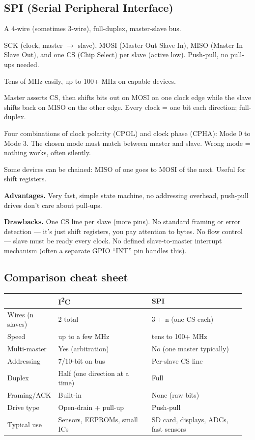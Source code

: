 \documentclass[11pt,a4paper]{article}
\begin{document}
\subsection{SPI (Serial Peripheral Interface)}

A 4-wire (sometimes 3-wire), full-duplex, master-slave bus.

\begin{description}[leftmargin=*, style=nextline]
    \item[Wires] SCK (clock, master $\rightarrow$ slave), MOSI (Master Out
    Slave In), MISO (Master In Slave Out), and one CS (Chip Select) per
    slave (active low). Push-pull, no pull-ups needed.
    \item[Speeds] Tens of MHz easily, up to 100+ MHz on capable devices.
    \item[Operation] Master asserts CS, then shifts bits out on MOSI on
    one clock edge while the slave shifts back on MISO on the other edge.
    Every clock = one bit each direction; full-duplex.
    \item[Modes] Four combinations of clock polarity (CPOL) and clock phase
    (CPHA): Mode 0 to Mode 3. The chosen mode must match between master and
    slave. Wrong mode = nothing works, often silently.
    \item[Daisy-chaining] Some devices can be chained: MISO of one goes to
    MOSI of the next. Useful for shift registers.
\end{description}

\textbf{Advantages.} Very fast, simple state machine, no addressing
overhead, push-pull drives don't care about pull-ups.

\textbf{Drawbacks.} One CS line per slave (more pins). No standard
framing or error detection --- it's just shift registers, you pay
attention to bytes. No flow control --- slave must be ready every clock.
No defined slave-to-master interrupt mechanism (often a separate GPIO
``INT'' pin handles this).

\subsection{Comparison cheat sheet}

\begin{tabular}{p{0.18\linewidth} p{0.39\linewidth} p{0.39\linewidth}}
\toprule
& \textbf{I\textsuperscript{2}C} & \textbf{SPI} \\
\midrule
Wires (n slaves) & 2 total & 3 + n (one CS each) \\
Speed & up to a few MHz & tens to 100+ MHz \\
Multi-master & Yes (arbitration) & No (one master typically) \\
Addressing & 7/10-bit on bus & Per-slave CS line \\
Duplex & Half (one direction at a time) & Full \\
Framing/ACK & Built-in & None (raw bits) \\
Drive type & Open-drain + pull-up & Push-pull \\
Typical use & Sensors, EEPROMs, small ICs & SD card, displays, ADCs, fast sensors \\
\bottomrule
\end{tabular}
\end{document}
